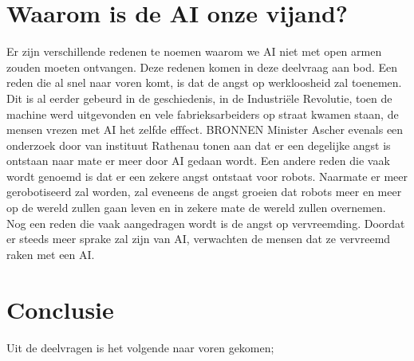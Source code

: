 \documentclass{article}
\begin{document}
\section{Waarom is de AI onze vijand?}
Er zijn verschillende redenen te noemen waarom we AI niet met open armen zouden moeten ontvangen. Deze redenen komen in deze deelvraag aan bod.
Een reden die al snel naar voren komt, is dat de angst op werkloosheid zal toenemen. Dit is al eerder gebeurd in de geschiedenis, in de Industriële Revolutie, toen de machine werd uitgevonden en vele fabrieksarbeiders op straat kwamen staan, de mensen vrezen met AI het zelfde efffect. BRONNEN Minister Ascher evenals een onderzoek door van instituut Rathenau tonen aan dat er een degelijke angst is ontstaan naar mate er meer door AI gedaan wordt. 
Een andere reden die vaak wordt genoemd is dat er een zekere angst ontstaat voor robots. Naarmate er meer gerobotiseerd zal worden, zal eveneens de angst groeien dat robots meer en meer op de wereld zullen gaan leven en in zekere mate de wereld zullen overnemen. 
Nog een reden die vaak aangedragen wordt is de angst op vervreemding. Doordat er steeds meer sprake zal zijn van AI, verwachten de mensen dat ze vervreemd raken met een AI. 

\section{Conclusie}
Uit de deelvragen is het volgende naar voren gekomen; 

\newpage
\nocite{robotsamenleving,vriendofvijand,arbeidsmarkt,breinoverbodig,stephenhawking,killemachine,uitgeroeid,autonomous,benificialai,pastandfuture}


% 
% 
\end{document}

